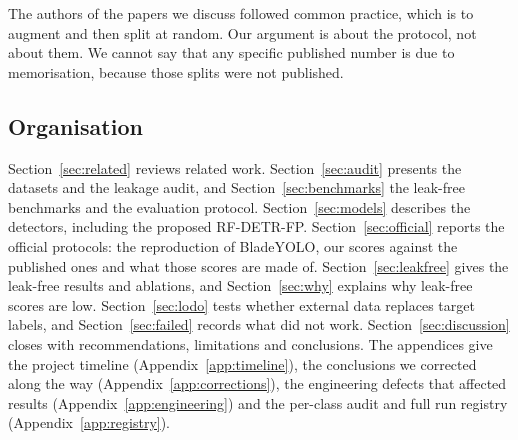 The authors of the papers we discuss followed common practice, which is to augment and then split at random. Our argument is about the protocol, not about them. We cannot say that any specific published number is due to memorisation, because those splits were not published.

\subsection{Organisation}
Section~\ref{sec:related} reviews related work. Section~\ref{sec:audit} presents the datasets and the leakage audit, and Section~\ref{sec:benchmarks} the leak-free benchmarks and the evaluation protocol. Section~\ref{sec:models} describes the detectors, including the proposed RF-DETR-FP. Section~\ref{sec:official} reports the official protocols: the reproduction of BladeYOLO, our scores against the published ones and what those scores are made of. Section~\ref{sec:leakfree} gives the leak-free results and ablations, and Section~\ref{sec:why} explains why leak-free scores are low. Section~\ref{sec:lodo} tests whether external data replaces target labels, and Section~\ref{sec:failed} records what did not work. Section~\ref{sec:discussion} closes with recommendations, limitations and conclusions. The appendices give the project timeline (Appendix~\ref{app:timeline}), the conclusions we corrected along the way (Appendix~\ref{app:corrections}), the engineering defects that affected results (Appendix~\ref{app:engineering}) and the per-class audit and full run registry (Appendix~\ref{app:registry}).
